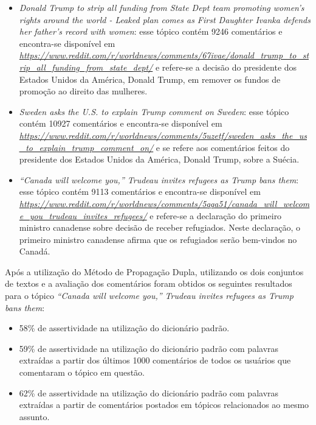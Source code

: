 \begin{itemize}
  \item
  \textit{Donald Trump to strip all funding from State Dept team promoting
  women's rights around the world - Leaked plan comes as First Daughter Ivanka
  defends her father's record with women}: esse tópico contém 9246
  comentários e encontra-se disponível em
  \textit{\url{https://www.reddit.com/r/worldnews/comments/67ivae/donald_trump_to_strip_all_funding_from_state_dept/}}
  e refere-se a decisão do presidente dos Estados Unidos da América, Donald
  Trump, em remover os fundos de promoção ao direito das mulheres.  
  \item
  \textit{Sweden asks the U.S. to explain Trump comment on
  Sweden}: esse tópico contém 10927
  comentários e encontra-se disponível em
  \textit{\url{https://www.reddit.com/r/worldnews/comments/5uzetf/sweden_asks_the_us_to_explain_trump_comment_on/}}
  e se refere aos comentários feitos do presidente dos Estados Unidos da
  América, Donald Trump, sobre a Suécia.
  
  \item\textit{“Canada will welcome you,” Trudeau invites refugees as Trump bans
  them}: esse tópico contém 9113
  comentários e encontra-se disponível em
  \textit{\url{https://www.reddit.com/r/worldnews/comments/5qqa51/canada_will_welcome_you_trudeau_invites_refugees/}}
  e refere-se a declaração do primeiro ministro canadense sobre decisão de
  receber refugiados. Neste declaração, o primeiro ministro canadense afirma que
  os refugiados serão bem-vindos no Canadá.
\end{itemize}
 
Após a utilização do Método de Propagação Dupla, utilizando os dois conjuntos
de textos e a avaliação dos comentários foram
obtidos os seguintes resultados para o tópico \textit{``Canada will welcome
you,” Trudeau invites refugees as Trump bans them}:
\begin{itemize}
  \item 58\% de assertividade na utilização do dicionário padrão.
  \item 59\% de assertividade na utilização do dicionário padrão com palavras
  extraídas a partir dos últimos 1000 comentários de todos os usuários que
  comentaram o tópico em questão.
  \item 62\% de assertividade na utilização do dicionário padrão com palavras
  extraídas a partir de comentários postados em tópicos relacionados ao mesmo
  assunto.
\end{itemize}

